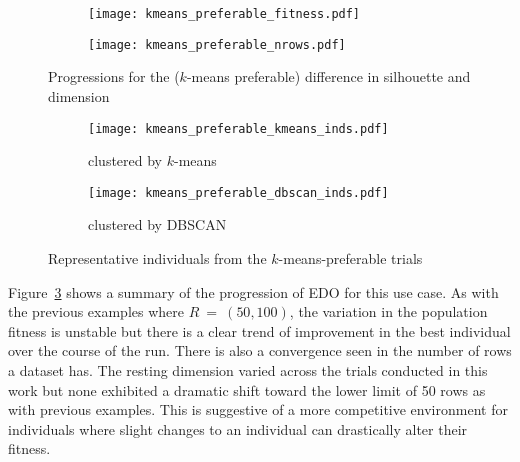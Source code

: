 \begin{figure}
    \centering
    \begin{subfigure}{\imgwidth}
        \texttt{[image: kmeans\_preferable\_fitness.pdf]}
        \label{fig:kmeans_preferable_fitness}
    \end{subfigure}

    \begin{subfigure}{\imgwidth}
        \texttt{[image: kmeans\_preferable\_nrows.pdf]}
        \label{fig:kmeans_preferable_nrows}
    \end{subfigure}
    \caption{%
        Progressions for the (\(k\)-means preferable) difference in silhouette
        and dimension
    }\label{fig:dbscan-silhouette}
\end{figure}

\begin{figure}
    \centering
    \begin{subfigure}{\imgwidth}
        \texttt{[image: kmeans\_preferable\_kmeans\_inds.pdf]}
        \caption{%
            clustered by \(k\)-means
        }\label{fig:kmeans_preferable_kmeans_inds}
    \end{subfigure}

    \vspace{1em}
    \begin{subfigure}{\imgwidth}
        \texttt{[image: kmeans\_preferable\_dbscan\_inds.pdf]}
        \caption{clustered by DBSCAN}\label{fig:kmeans_preferable_dbscan_inds}
    \end{subfigure}
    \caption{%
        Representative individuals from the \(k\)-means-preferable trials
    }\label{fig:dbscan-inds}
\end{figure}

Figure~\ref{fig:dbscan-silhouette} shows a summary of the progression of EDO for
this use case. As with the previous examples where \(R~=~(50, 100)\), the
variation in the population fitness is unstable but there is a clear trend of
improvement in the best individual over the course of the run. There is also a
convergence seen in the number of rows a dataset has. The resting dimension
varied across the trials conducted in this work but none exhibited a dramatic
shift toward the lower limit of 50 rows as with previous examples. This is
suggestive of a more competitive environment for individuals where slight
changes to an individual can drastically alter their fitness.

